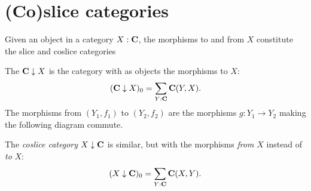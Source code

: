\section{(Co)slice categories}
Given an object in a category $ X: \mathbf{C} $, the morphisms to and from $ X $ constitute the slice and coslice categories
\begin{definition}
  The  $ \mathbf{C} \downarrow X $ is the category with as objects the morphisms to $ X $:
  \[ (\mathbf{C} \downarrow X)_0 = \sum_{Y: \mathbf{C}} \mathbf{C}(Y, X). \]
  The morphisms from $ (Y_1, f_1) $ to $ (Y_2, f_2) $ are the morphisms $ g: Y_1 \to Y_2 $ making the following diagram commute.
  \begin{center}
  \end{center}
\end{definition}
The \textit{coslice category} $ X \downarrow \mathbf{C} $ is similar, but with the morphisms \textit{from} $ X $ instead of \textit{to} $ X $:
\[ (X \downarrow \mathbf{C})_0 = \sum_{Y: \mathbf{C}} \mathbf{C}(X, Y). \]

